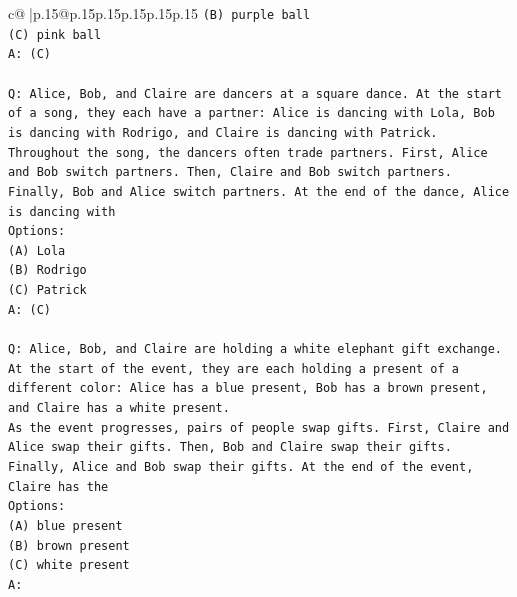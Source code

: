 \documentclass{article}
\begin{document}
{\begin{supertabular}{c@{$\;$}|p{.15\linewidth}@{}p{.15\linewidth}p{.15\linewidth}p{.15\linewidth}p{.15\linewidth}p{.15\linewidth}}
{{{\texttt{(B) purple ball} \\
\texttt{(C) pink ball} \\
\texttt{A: (C)} \\
\\ 
\texttt{Q: Alice, Bob, and Claire are dancers at a square dance. At the start of a song, they each have a partner: Alice is dancing with Lola, Bob is dancing with Rodrigo, and Claire is dancing with Patrick.} \\
\texttt{Throughout the song, the dancers often trade partners. First, Alice and Bob switch partners. Then, Claire and Bob switch partners. Finally, Bob and Alice switch partners. At the end of the dance, Alice is dancing with} \\
\texttt{Options:} \\
\texttt{(A) Lola} \\
\texttt{(B) Rodrigo} \\
\texttt{(C) Patrick} \\
\texttt{A: (C)} \\
\\ 
\texttt{Q: Alice, Bob, and Claire are holding a white elephant gift exchange. At the start of the event, they are each holding a present of a different color: Alice has a blue present, Bob has a brown present, and Claire has a white present.} \\
\texttt{As the event progresses, pairs of people swap gifts. First, Claire and Alice swap their gifts. Then, Bob and Claire swap their gifts. Finally, Alice and Bob swap their gifts. At the end of the event, Claire has the} \\
\texttt{Options:} \\
\texttt{(A) blue present} \\
\texttt{(B) brown present} \\
\texttt{(C) white present} \\
\texttt{A:} \\
            }
        }
    }
     \\ \\


\end{supertabular}}
\end{document}
